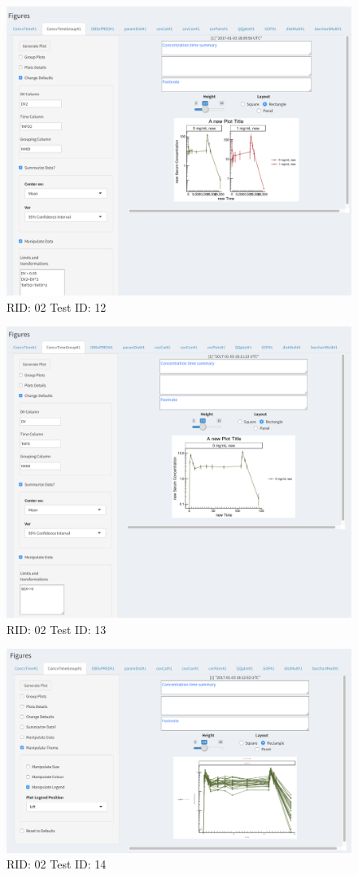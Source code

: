 \begin{figure}[H]
\includegraphics[width=.8\textwidth]{screencaps/02-12-1.png}
\caption{RID: 02 Test ID: 12}
\end{figure}
\begin{figure}[H]
\includegraphics[width=.8\textwidth]{screencaps/02-13-1.png}
\caption{RID: 02 Test ID: 13}
\end{figure}
\begin{figure}[H]
\includegraphics[width=.8\textwidth]{screencaps/02-14-1.png}
\caption{RID: 02 Test ID: 14}
\end{figure}

